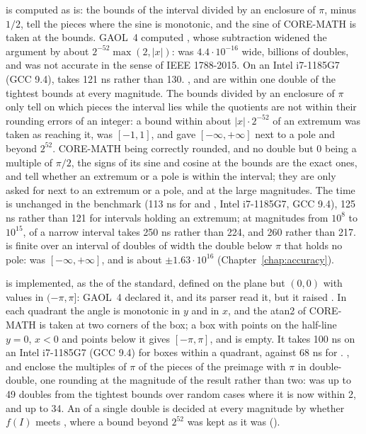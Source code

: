 \documentclass[12pt,a4paper,twoside,openright]{book}
\begin{document}
 is computed as  is: the bounds of the interval
divided by an enclosure of $\pi$, minus $1/2$, tell the pieces where the sine
is monotonic, and the sine of CORE-MATH is taken at the bounds.\newinvfive{}
GAOL~4 computed , whose subtraction widened the
argument by about $2^{-52} \max(2, |x|)$:  was
$4.4 \cdot 10^{-16}$ wide, billions of doubles, and  was not
accurate in the sense of IEEE 1788-2015. On an Intel i7-1185G7 (GCC 9.4),
 takes 121 ns rather than 130. ,  and
 are within one double of the tightest bounds at every
magnitude. The bounds divided by an enclosure of $\pi$ only tell on which
pieces the interval lies while the quotients are not within their rounding
errors of an integer: a bound within about $|x| \cdot 2^{-52}$ of an extremum
was taken as reaching it,  was $[-1, 1]$, and
 gave $[-\infty, +\infty]$ next to a pole and beyond $2^{52}$.
CORE-MATH being correctly rounded, and no double but 0 being a multiple of
$\pi/2$, the signs of its sine and cosine at the bounds are the exact ones,
and tell whether an extremum or a pole is within the interval; they are only
asked for next to an extremum or a pole, and at the large magnitudes. The
time is unchanged in the benchmark (113 ns for  and ,
Intel i7-1185G7, GCC 9.4), 125 ns rather than 121 for intervals holding an
extremum; at magnitudes from $10^8$ to $10^{15}$,  of a narrow
interval takes 250 ns rather than 224, and  260 rather than 217.
 is finite over an interval of doubles of width the double below
$\pi$ that holds no pole:  was
$[-\infty, +\infty]$, and is about $\pm 1.63 \cdot 10^{16}$
(Chapter~\ref{chap:accuracy}).

\medskip
{} is implemented, as the  of the standard,
defined on the plane but $(0, 0)$ with values in $(-\pi, \pi]$: GAOL~4
declared it, and its parser read it, but it raised
.\newinvfive{} In each quadrant the angle
is monotonic in $y$ and in $x$, and the atan2 of CORE-MATH is taken at two
corners of the box; a box with points on the half-line $y = 0$, $x < 0$ and
points below it gives $[-\pi, \pi]$, and  is empty. It
takes 100 ns on an Intel i7-1185G7 (GCC 9.4) for boxes within a quadrant,
against 68 ns for . ,  and
 enclose the multiples of $\pi$ of the pieces of the
preimage with $\pi$ in double-double, one rounding at the magnitude of the
result rather than two:  was up to 49 doubles from the
tightest bounds over random cases where it is now within 2, and
 up to 34. An  of a single double is decided at
every magnitude by whether $f(I)$ meets , where a bound beyond
$2^{52}$ was kept as it was ().
\end{document}
